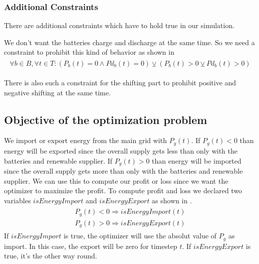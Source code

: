 \subsubsection{Additional Constraints}
There are additional constraints which have to hold true in our simulation.

We don't want the batteries charge and discharge at the same time.
So we need a constraint to prohibit this kind of behavior as shown in 
\begin{align} \label{eq:batteryConstraint}
\begin{split}
\forall b \in B, \forall t \in T: (P_{b}(t) = 0 \wedge Pd_{b}(t) = 0) \veebar (P_{b}(t)>0 \veebar Pd_{b}(t)>0)
\end{split}
\end{align}

There is also such a constraint for the shifting part to prohibit positive and negative shifting at the same time.

\subsection{Objective of the optimization problem}
We import or export energy from the main grid with $P_{g}(t)$.
If $P_{g}(t) < 0$ than energy will be exported since the overall supply gets less than only with the batteries and renewable supplier.
If $P_{g}(t) > 0$ than energy will be imported since the overall supply gets more than only with the batteries and renewable supplier.
We can use this to compute our profit or loss since we want the optimizer to maximize the profit.
To compute profit and loss we declared two variables $isEnergyImport$ and $isEnergyExport$ as shown in .
\begin{align} \label{eq:importexport}
\begin{split}
P_{g}(t) < 0 \Rightarrow isEnergyImport(t)\\
P_{g}(t) > 0 \Rightarrow isEnergyExport(t)
\end{split}
\end{align}
If $isEnergyImport$ is true, the optimizer will use the absolut value of $P_{g}$ as import.
In this case, the export will be zero for timestep $t$.
If $isEnergyExport$ is true, it's the other way round.


